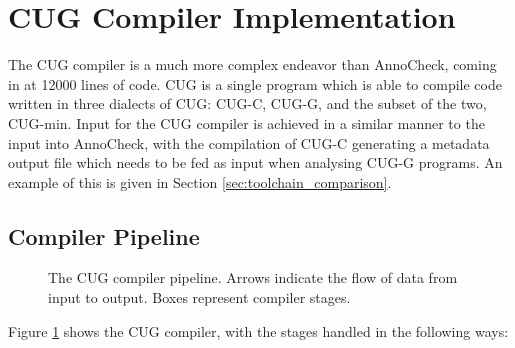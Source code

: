 \documentclass[a4paper,12pt,twoside,openright]{report}
\def\compilerloccount{12000 }
\begin{document}
\section{CUG Compiler Implementation}

The CUG compiler is a much more complex endeavor than AnnoCheck, coming in at
\compilerloccount lines of code. CUG is a single program which is able to
compile code written in three dialects of CUG: CUG-C, CUG-G, and the subset of
the two, CUG-min. Input for the CUG compiler is achieved in a similar manner to
the input into AnnoCheck, with the compilation of CUG-C generating a metadata
output file which needs to be fed as input when analysing CUG-G programs. An
example of this is given in Section \ref{sec:toolchain_comparison}.

\subsection{Compiler Pipeline}

\label{sec:compiler_pipeline}

\begin{figure}[h]
\centering
\def\svgwidth{\linewidth}
\scriptsize{}
\caption{The CUG compiler pipeline. Arrows indicate the flow of data from
input to output. Boxes represent compiler stages.}
\label{fig:cug_compiler_pipeline}
\end{figure}

Figure \ref{fig:cug_compiler_pipeline} shows the CUG compiler, with the
stages handled in the following ways:
\end{document}
